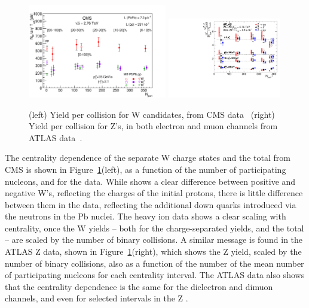 \begin{figure}[t]
\begin{center}
\includegraphics[width=0.54\textwidth]{electroweak_figs/Fig2.pdf}
\includegraphics[width=0.44\textwidth]{electroweak_figs/fig_04.pdf}
\caption[]{(left) Yield per collision for W candidates, from CMS data~\cite{Chatrchyan:2012nt} (right) Yield per collision for Z's, in both electron and muon channels from ATLAS data~\cite{Aad:2012ew}.}
\label{fig:pas:zw_cent}
\end{center}
\end{figure}

The centrality dependence of the separate W charge states and the total from CMS
is shown in Figure~\ref{fig:pas:zw_cent}(left),
as a function of the number of participating nucleons, and for the \pp data.
While \pp shows a clear difference between positive and negative W's, reflecting the charges of the initial protons, there is little
difference between them in the \PbPb data, reflecting the additional down quarks introduced via the neutrons in the Pb nuclei.
The heavy ion data shows a clear scaling with centrality, once the W yields -- both for the charge-separated yields, and the
total -- are scaled by the number of binary collisions.
A similar message is found in the ATLAS Z data, shown in Figure~\ref{fig:pas:zw_cent}(right), which shows the Z yield, scaled by
the number of binary collisions, also as a function of the number of the mean number of participating nucleons for each
centrality interval.  The ATLAS data also shows that the centrality dependence is the same for the dielectron and dimuon channels,
and even for selected intervals in the Z \pT.

